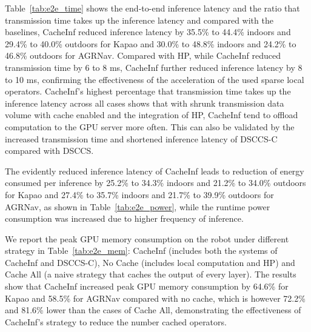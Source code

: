 Table~\ref{tab:e2e_time} shows the end-to-end inference latency and the ratio that transmission time takes up the inference latency and compared with the baselines, CacheInf reduced inference latency by 35.5\% to 44.4\% indoors and 29.4\% to 40.0\% outdoors for Kapao and 30.0\% to 48.8\% indoors and 24.2\% to 46.8\% outdoors for AGRNav.
Compared with HP, while CacheInf reduced transmission time by 6 to 8 ms, CacheInf further reduced inference latency by 8 to 10 ms, confirming the effectiveness of the acceleration of the used sparse local operators.
CacheInf's highest percentage that transmission time takes up the inference latency across all cases shows that with shrunk transmission data volume with cache enabled and the integration of HP, CacheInf tend to offload computation to the GPU server more often.
This can also be validated by the increased transmission time and shortened inference latency of DSCCS-C compared with DSCCS.

The evidently reduced inference latency of CacheInf leads to reduction of energy consumed per inference by 25.2\% to 34.3\% indoors and 21.2\% to 34.0\% outdoors for Kapao and 27.4\% to 35.7\% indoors and 21.7\% to 39.9\% outdoors for AGRNav, as shown in Table~\ref{tab:e2e_power}, while the runtime power consumption was increased due to higher frequency of inference.

We report the peak GPU memory consumption on the robot under different strategy in Table~\ref{tab:e2e_mem}: CacheInf (includes both the systems of CacheInf and DSCCS-C), No Cache (includes local computation and HP) and Cache All (a naive strategy that caches the output of every layer).
The results show that CacheInf increased peak GPU memory consumption by 64.6\% for Kapao and 58.5\% for AGRNav compared with no cache, which is however 72.2\% and 81.6\% lower than the cases of Cache All, demonstrating the effectiveness of CacheInf's strategy to reduce the number cached operators.


